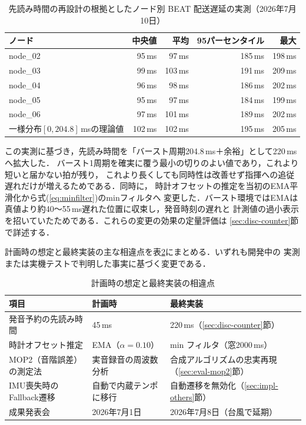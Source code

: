 \documentclass[uplatex,dvipdfmx]{jlreq}
\begin{document}
\begin{table}[tbp]
  \centering
  \caption{先読み時間の再設計の根拠としたノード別 BEAT 配送遅延の実測（2026年7月10日）}
  \label{tab:prelim-delay}
  \small
  \begin{tabular}{lrrrr}
    \hline
    ノード & 中央値 & 平均 & 95パーセンタイル & 最大 \\
    \hline
    node\_02 & 95\,ms & 97\,ms & 185\,ms & 198\,ms \\
    node\_03 & 99\,ms & 103\,ms & 191\,ms & 209\,ms \\
    node\_04 & 96\,ms & 98\,ms & 186\,ms & 202\,ms \\
    node\_05 & 95\,ms & 97\,ms & 184\,ms & 199\,ms \\
    node\_06 & 97\,ms & 101\,ms & 189\,ms & 202\,ms \\
    \hline
    一様分布$[0,204.8]$\,msの理論値 & 102\,ms & 102\,ms & 195\,ms & 205\,ms \\
    \hline
  \end{tabular}
\end{table}

この実測に基づき，先読み時間を「バースト周期204.8\,ms＋余裕」として220\,msへ拡大した．
バースト1周期を確実に覆う最小の切りのよい値であり，これより短いと届かない拍が残り，
これより長くしても同時性は改善せず指揮への追従遅れだけが増えるためである．同時に，
時計オフセットの推定を当初のEMA平滑化から式(\ref{eq:minfilter})のminフィルタへ
変更した．バースト環境ではEMAは真値より約40〜55\,ms遅れた位置に収束し，発音時刻の遅れと
計測値の過小表示を招いていたためである．これらの変更の効果の定量評価は
\ref{sec:disc-counter}節で詳述する．

計画時の想定と最終実装の主な相違点を表\ref{tab:changes}にまとめる．いずれも開発中の
実測または実機テストで判明した事実に基づく変更である．

\begin{table}[tbp]
  \centering
  \caption{計画時の想定と最終実装の相違点}\label{tab:changes}
  \small
  \begin{tabular}{lll}
    \hline
    項目 & 計画時 & 最終実装 \\
    \hline
    発音予約の先読み時間 & 45\,ms & 220\,ms（\ref{sec:disc-counter}節） \\
    時計オフセット推定 & EMA（$\alpha=0.10$） & min フィルタ（窓2000\,ms） \\
    MOP2（音階誤差）の測定法 & 実音録音の周波数分析 & 合成アルゴリズムの忠実再現（\ref{sec:eval-mop2}節） \\
    IMU喪失時のFallback遷移 & 自動で内蔵テンポに移行 & 自動遷移を無効化（\ref{sec:impl-others}節） \\
    成果発表会 & 2026年7月1日 & 2026年7月8日（台風で延期） \\
    \hline
  \end{tabular}
\end{table}
\end{document}
